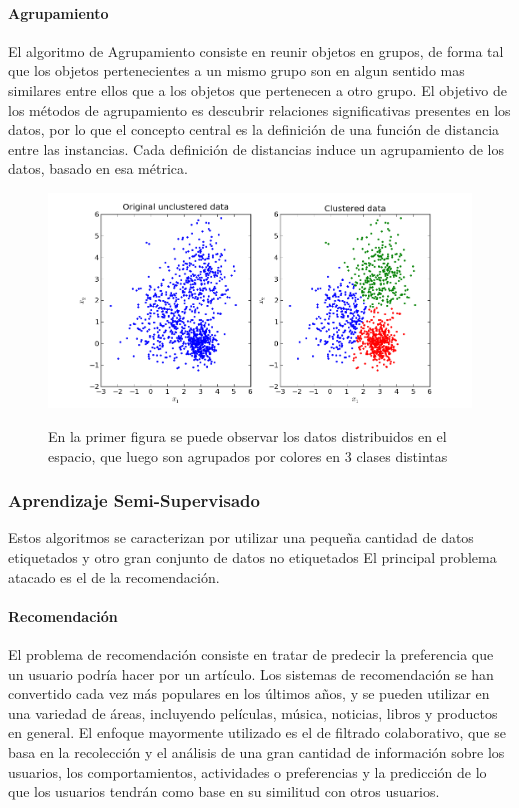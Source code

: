 \documentclass[a4paper,11pt,spanish]{book}
\begin{document}
	\paragraph {Agrupamiento}
	   El algoritmo de Agrupamiento consiste en reunir objetos en grupos, de forma tal que los objetos pertenecientes a un mismo grupo son en algun sentido mas similares
	   entre ellos que a los objetos que pertenecen a otro grupo. El objetivo de los métodos de agrupamiento es descubrir relaciones significativas presentes en los datos, por lo
	   que el concepto central es la definición de una función de distancia entre las instancias. Cada definición de distancias induce un agrupamiento de los datos, basado en esa métrica.

	  \begin{figure}[h]
	    \includegraphics[scale=0.5]{./img/stackoverflow_clustering.png}\\
	    \caption{En la primer figura se puede observar los datos distribuidos en el espacio, que luego son agrupados por colores en 3 clases distintas}
	    \label{fig:clustering}
	  \end{figure}

      \subsubsection{Aprendizaje Semi-Supervisado}
	Estos algoritmos se caracterizan por utilizar una pequeña cantidad de datos etiquetados y otro gran conjunto de datos no etiquetados
	El principal problema atacado es el de la recomendación.
	\paragraph{Recomendación}
	  El problema de recomendación consiste en tratar de predecir la preferencia que un usuario podría hacer por un artículo. Los sistemas de recomendación se han convertido cada
	  vez más populares en los últimos años, y se pueden utilizar en una variedad de áreas, incluyendo películas, música, noticias, libros y productos en general.
	  El enfoque mayormente utilizado es el de filtrado colaborativo, que se basa en la recolección y el análisis de una gran cantidad de información sobre los usuarios,
	  los comportamientos, actividades o preferencias y la predicción de lo que los usuarios tendrán como base en su similitud con otros usuarios.
\end{document}
